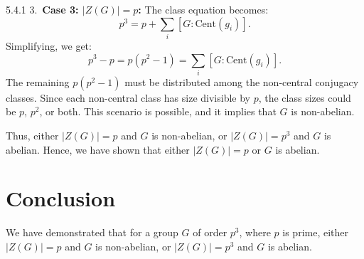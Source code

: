 \documentclass[12pt]{amsart}
\theoremstyle{definition}
\numberwithin{equation}{section}
\begin{document}
\begin{exercise}{5.4.1}
    3.\ \textbf{Case 3: \(|Z(G)| = p\):} The class equation becomes:
    \[
    p^3 = p + \sum_{i} [G : \text{Cent}(g_i)].
    \]
    Simplifying, we get:
    \[
    p^3 - p = p(p^2 - 1) = \sum_{i} [G : \text{Cent}(g_i)].
    \]
    The remaining \(p(p^2 - 1)\) must be distributed among the non-central conjugacy classes. Since each non-central class has size divisible by \(p\), the class sizes could be \(p\), \(p^2\), or both. This scenario is possible, and it implies that \(G\) is non-abelian.

    Thus, either \(|Z(G)| = p\) and \(G\) is non-abelian, or \(|Z(G)| = p^3\) and \(G\) is abelian. Hence, we have shown that either \(|Z(G)| = p\) or \(G\) is abelian.

    \section*{Conclusion}
    We have demonstrated that for a group \(G\) of order \(p^3\), where \(p\) is prime, either \(|Z(G)| = p\) and \(G\) is non-abelian, or \(|Z(G)| = p^3\) and \(G\) is abelian.

\end{exercise}
\newpage
\end{document}
